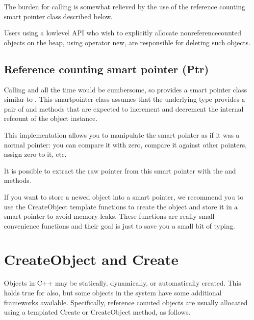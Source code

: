 \documentclass[letterpaper,10pt,english]{sphinxmanual}
\renewcommand{\sphinxcode}[1]{\texttt{\small{#1}}}
\begin{document}
The burden for calling \sphinxcode{} is somewhat relieved by the use of
the reference counting smart pointer class described below.

Users using a low\sphinxhyphen{}level API who wish to explicitly allocate
non\sphinxhyphen{}reference\sphinxhyphen{}counted objects on the heap, using operator new, are responsible
for deleting such objects.


\subsection{Reference counting smart pointer (Ptr)}
\label{\detokenize{object-model:reference-counting-smart-pointer-ptr}}
Calling \sphinxcode{} and \sphinxcode{} all the time would be cumbersome, so 
provides a smart pointer class \sphinxcode{} similar to
\sphinxcode{}. This smart\sphinxhyphen{}pointer class assumes that the
underlying type provides a pair of \sphinxcode{} and \sphinxcode{} methods that are
expected to increment and decrement the internal refcount of the object
instance.

This implementation allows you to manipulate the smart pointer as if it was a
normal pointer: you can compare it with zero, compare it against other pointers,
assign zero to it, etc.

It is possible to extract the raw pointer from this smart pointer with the
\sphinxcode{} and \sphinxcode{} methods.

If you want to store a newed object into a smart pointer, we recommend you to
use the CreateObject template functions to create the object and store it in a
smart pointer to avoid memory leaks. These functions are really small
convenience functions and their goal is just to save you a small bit of typing.


\section{CreateObject and Create}
\label{\detokenize{object-model:createobject-and-create}}
Objects in C++ may be statically, dynamically, or automatically created.  This
holds true for  also, but some objects in the system have some additional
frameworks available. Specifically, reference counted objects are usually
allocated using a templated Create or CreateObject method, as follows.
\end{document}
